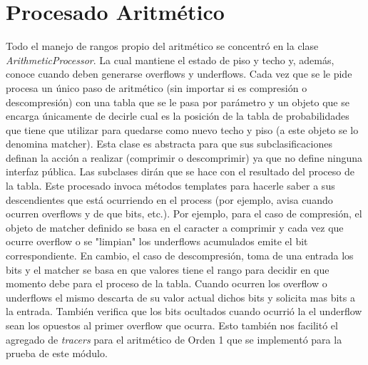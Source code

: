 \section{Procesado Aritmético}
Todo el manejo de rangos propio del aritmético se concentró en la clase \textit{ArithmeticProcessor}. La cual mantiene el estado de piso y techo y, además, conoce cuando deben generarse overflows y underflows. Cada vez que se le pide procesa un único paso de aritmético (sin importar si es compresión o descompresión) con una tabla que se le pasa por parámetro y un objeto que se encarga únicamente de decirle cual es la posición de la tabla de probabilidades que tiene que utilizar para quedarse como nuevo techo y piso (a este objeto se lo denomina matcher).
Esta clase es abstracta para que sus subclasificaciones definan la acción a realizar (comprimir o descomprimir) ya que no define ninguna interfaz pública. Las subclases dirán que se hace con el resultado del proceso de la tabla. Este procesado invoca métodos templates para hacerle saber a sus descendientes que está ocurriendo en el process (por ejemplo, avisa cuando ocurren overflows y de que bits, etc.). 
Por ejemplo, para el caso de compresión, el objeto de matcher definido se basa en el caracter a comprimir y cada vez que ocurre overflow o se "limpian" los underflows acumulados emite el bit correspondiente.
En cambio, el caso de descompresión, toma de una entrada los bits y el matcher se basa en que valores tiene el rango para decidir en que momento debe para el proceso de la tabla. Cuando ocurren los overflow o underflows el mismo descarta de su valor actual dichos bits y solicita mas bits a la entrada. También verifica que los bits ocultados cuando ocurrió la el underflow sean los opuestos al primer overflow que ocurra.
Esto también nos facilitó el agregado de \textit{tracers} para el aritmético de Orden 1 que se implementó para la prueba de este módulo.
